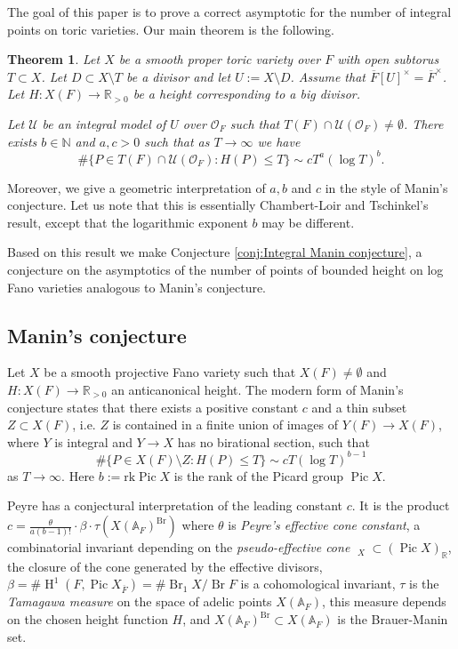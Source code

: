 \documentclass[a4paper,11pt,reqno]{amsart}
\newcommand{\N}{\mathbb{N}}\newcommand{\Z}{\mathbb{Z}}
\newcommand{\R}{\mathbb{R}}
\newcommand{\A}{\mathbb{A}}
\DeclareMathOperator{\Pic}{Pic}
\DeclareMathOperator{\Eff}{\overline{Eff}}
\DeclareMathOperator{\Br}{Br}
\DeclareMathOperator{\HH}{H}
\newtheorem{theorem}{Theorem}[section]
\theoremstyle{definition}
\begin{document}
The goal of this paper is to prove a correct asymptotic for the number of integral points on toric varieties. Our main theorem is the following.
\begin{theorem}\label{thm:Main theorem all integral points}
 	Let $X$ be a smooth proper toric variety over $F$ with open subtorus $T \subset X$. Let $D \subset X \setminus T$ be a divisor and let $U := X \setminus D$. Assume that $\overline{F}[U]^{\times} = \overline{F}^{\times}$. Let $H: X(F) \to \R_{> 0}$ be a height corresponding to a big divisor.
 	
 	Let $\mathcal{U}$ be an integral model of $U$ over $\mathcal{O}_F$ such that $T(F) \cap \mathcal{U}(\mathcal{O}_F) \neq \emptyset$. There exists $b \in \N$ and $a, c > 0$ such that as $T \to \infty$ we have
 	\[
 	\#\{P \in T(F) \cap \mathcal{U}(\mathcal{O}_F): H(P) \leq T\} \sim c T^a (\log T)^b.
 	\]
\end{theorem}
Moreover, we give a geometric interpretation of $a,b$ and $c$ in the style of Manin's conjecture. Let us note that this is essentially Chambert-Loir and Tschinkel's result, except that the logarithmic exponent $b$ may be different.

Based on this result we make Conjecture \ref{conj:Integral Manin conjecture}, a conjecture on the asymptotics of the number of points of bounded height on log Fano varieties analogous to Manin's conjecture.
\subsection{Manin's conjecture}
Let $X$ be a smooth projective Fano variety such that $X(F) \neq \emptyset$ and $H: X(F) \to \R_{> 0}$ an anticanonical height. The modern form of Manin's conjecture states that there exists a positive constant $c$ and a thin subset $Z \subset X(F)$, i.e. $Z$ is contained in a finite union of images of $Y(F) \to X(F)$, where $Y$ is integral and $Y \to X$ has no birational section, such that
\begin{equation*}
	\# \{P \in X(F) \setminus Z: H(P) \leq T\} \sim c T (\log T)^{b - 1}
\end{equation*}
as $T \to \infty$. Here $b := \text{rk} \Pic X$ is the rank of the Picard group $\Pic X$.

Peyre has a conjectural interpretation \cite{Peyre1995Hauteurs} of the leading constant $c$. It is the product $c = \frac{\theta}{a (b - 1)!} \cdot \beta \cdot \tau(X(\A_F)^{\Br})$ where $\theta$ is \emph{Peyre's effective cone constant}, a combinatorial invariant depending on the \emph{pseudo-effective cone} $\Eff_X \subset (\Pic X)_{\R}$, the closure of the cone generated by the effective divisors, $\beta = \# \HH^1(F, \Pic X_{\overline{F}}) = \# \Br_1 X/\Br F$ is a cohomological invariant, $\tau$ is the \emph{Tamagawa measure} on the space of adelic points $X(\A_F)$, this measure depends on the chosen height function $H$, and $X(\A_F)^{\Br} \subset X(\A_F)$ is the Brauer-Manin set.
\end{document}
